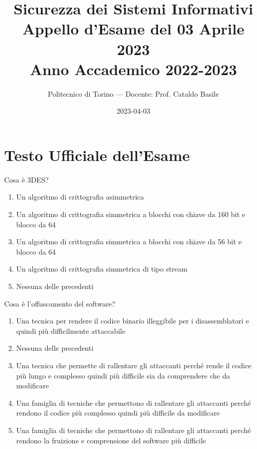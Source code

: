 \documentclass[11pt,a4paper]{article}
\begin{document}
\title{\textbf{Sicurezza dei Sistemi Informativi} \\ \large Appello d'Esame del 03 Aprile 2023 \\ \small Anno Accademico 2022-2023}
\author{Politecnico di Torino --- Docente: Prof. Cataldo Basile}
\date{2023-04-03}
\maketitle


\section{Testo Ufficiale dell'Esame}

\begin{questionbox}
Cosa \`e 3DES?
\begin{enumerate}[label=\alph*.]
    \item Un algoritmo di crittografia asimmetrica
    \item Un algoritmo di crittografia simmetrica a blocchi con chiave da 160 bit e blocco da 64
    \item Un algoritmo di crittografia simmetrica a blocchi con chiave da 56 bit e blocco da 64
    \item Un algoritmo di crittografia simmetrica di tipo stream
    \item Nessuna delle precedenti
\end{enumerate}
\end{questionbox}

\begin{questionbox}
Cosa \`e l'offuscamento del software?
\begin{enumerate}[label=\alph*.]
    \item Una tecnica per rendere il codice binario illeggibile per i disassemblatori e quindi pi\`u difficilmente attaccabile
    \item Nessuna delle precedenti
    \item Una tecnica che permette di rallentare gli attaccanti perch\'e rende il codice pi\`u lungo e complesso quindi pi\`u difficile sia da comprendere che da modificare
    \item Una famiglia di tecniche che permettono di rallentare gli attaccanti perch\'e rendono il codice pi\`u complesso quindi pi\`u difficile da modificare
    \item Una famiglia di tecniche che permettono di rallentare gli attaccanti perch\'e rendono la fruizione e comprensione del software pi\`u difficile
\end{enumerate}
\end{questionbox}
\end{document}
